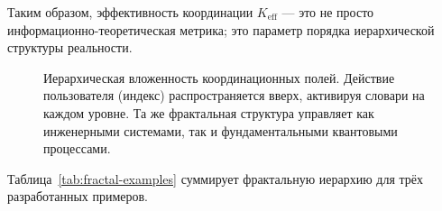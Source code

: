 \documentclass[12pt,a4paper]{article}
\theoremstyle{remark}
\begin{document}
	Таким образом, эффективность координации $K_{\mathrm{eff}}$ — это не просто информационно-теоретическая метрика; это параметр порядка иерархической структуры реальности.
	
	\begin{figure}[htbp]
		\centering
		\caption{Иерархическая вложенность координационных полей. Действие пользователя (индекс) распространяется вверх, активируя словари на каждом уровне. Та же фрактальная структура управляет как инженерными системами, так и фундаментальными квантовыми процессами.}
		\label{fig:hierarchy}
	\end{figure}
	
	Таблица~\ref{tab:fractal-examples} суммирует фрактальную иерархию для трёх разработанных примеров.
	
\end{document}

